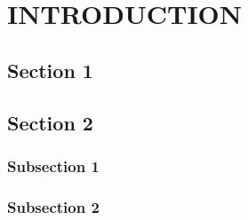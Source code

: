 
\chapter{\uppercase{Introduction}} %

\label{intro} %

\section{Section 1}

\section{Section 2}

\subsection{Subsection 1}

\subsection{Subsection 2}
